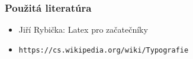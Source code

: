 \documentclass{beamer}
\begin{document}
\begin{frame}
\frametitle{Použitá literatúra}
\begin{itemize}
\item{Jiří Rybička: Latex pro začatečníky}
\item{\texttt{https://cs.wikipedia.org/wiki/Typografie}}

\end{itemize}
\end{frame}
\end{document}
